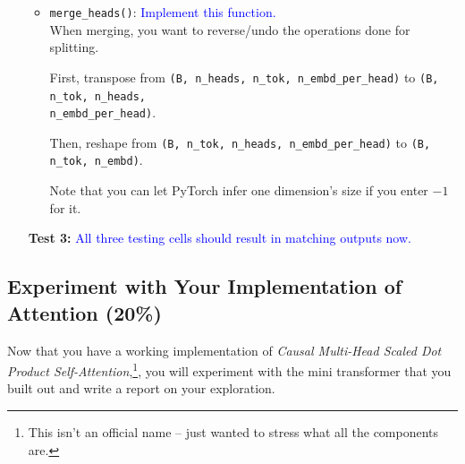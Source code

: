 \documentclass{article}
\begin{document}
\begin{enumerate}
\begin{itemize}
        


        \item \verb|merge_heads()|: \textcolor{blue}{Implement this function.}
        \\
        When merging, you want to reverse/undo the operations done for
        splitting.

        First, transpose from \verb|(B, n_heads, n_tok, n_embd_per_head)| to
        \verb|(B, n_tok, n_heads, | \\ \verb|n_embd_per_head)|.

        Then, reshape from \verb|(B, n_tok, n_heads, n_embd_per_head)| to
        \verb|(B, n_tok, n_embd)|.
        
        Note that you can let PyTorch infer one dimension's size if you enter
        $-1$ for it.
        \end{itemize}

        \item[\textbf{Test 3:}]
        \textcolor{blue}{All three testing cells should result in matching outputs now.}
        
    \end{enumerate}


    \subsection{Experiment with Your Implementation of Attention (20\%)}

    Now that you have a working implementation of \textit{Causal Multi-Head
    Scaled Dot Product Self-Attention},\footnote{This isn't an official name --
    just wanted to stress what all the components are.}, you will experiment
    with the mini transformer that you built out and write a report on your
    exploration.  
\end{document}

